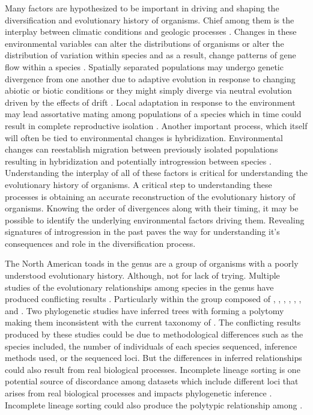 Many factors are hypothesized to be important in driving and shaping the 
diversification and evolutionary history of organisms. 
Chief among them is the interplay between climatic conditions and geologic processes
\parencite{hua2013}.
Changes in these environmental variables can alter the distributions of organisms
or alter the distribution of variation within species and as a result,
change patterns of gene flow within a species \parencite{coyne2004}.
Spatially separated populations may undergo genetic divergence from one another due 
to adaptive evolution in response to changing abiotic or biotic conditions 
or they might simply diverge via neutral evolution driven by the effects of drift \parencite{coyne2004}.
Local adaptation in response to the environment may lead assortative mating 
among populations of a species which in time could result in complete reproductive
isolation \parencite{mallet2008}.  
Another important process, which itself will often be tied to environmental changes
is hybridization. 
Environmental changes can reestablish migration between previously isolated 
populations resulting in hybridization and potentially introgression between species 
\parencite{abbot2013}.
Understanding the interplay of all of these factors is critical for understanding
the evolutionary history of organisms.
A critical step to understanding these processes is obtaining an accurate 
reconstruction of the evolutionary history of organisms. 
Knowing the order of divergences along with their timing, it may be possible to
identify the underlying environmental factors driving them. 
Revealing signatures of introgression in the past paves the way for  
understanding it's consequences and role in the diversification process. 


The North American toads in the genus \anaxyrus are a group of organisms with a 
poorly understood evolutionary history. 
Although, not for lack of trying.
Multiple studies of the evolutionary relationships among species in the genus have produced
conflicting results \parencite{fontenot2011,graybeal1997,masta2002,pramuk2007,pyron2011,portik2023}.
Particularly within the \americanus group composed of \amer, \baxteri, \fowl, 
\hemiophrys, \houstonensis, \terr, and \wood.
Two phylogenetic studies have inferred trees with \fowl forming a polytomy making 
them inconsistent with the current taxonomy of \anaxyrus \parencite{fontenot2011,masta2002}.
The conflicting results produced by these studies could be due to methodological differences such as
the species included, the number of individuals of each species sequenced, inference 
methods used, or the sequenced loci. 
But the differences in inferred relationships could also result from real biological processes. 
Incomplete lineage sorting is one potential source of discordance among datasets 
which include different loci that arises from real biological processes and 
impacts phylogenetic inference \parencite{kubatko2007}. 
Incomplete lineage sorting could also produce the polytypic relationship among
\fowl. 

